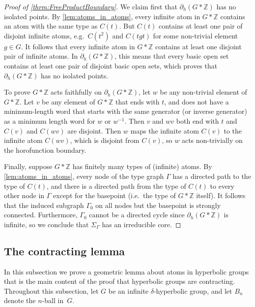 \documentclass[11pt,letterpaper]{amsart}
\theoremstyle{definition}
\newcommand{\Z}{\mathbb{Z}}
\begin{document}
\begin{proof}[Proof of \cref{thrm:FreeProductBoundary}]
We claim first that $\partial_h(G*\Z)$ has no isolated points.  By \cref{lem:atoms_in_atoms}, every infinite atom in $G*\Z$ contains an atom with the same type as $C(t)$.  But $C(t)$ contains at least one pair of disjoint infinite atoms, e.g.\ $C(t^2)$ and $C(tgt)$ for some non-trivial element $g\in G$.  It follows that every infinite atom in $G*\Z$ contains at least one disjoint pair of infinite atoms.  In $\partial_h(G*\Z)$, this means that every basic open set contains at least one pair of disjoint basic open sets, which proves that $\partial_h (G*\Z)$ has no isolated points.

To prove $G*\Z$ acts faithfully on $\partial_h(G*\Z)$, let $w$ be any non-trivial element of $G*\Z$.  Let $v$ be any element of $G*\Z$ that ends with $t$, and does not have a minimum-length word that starts with the same generator (or inverse generator) as a minimum length word for $w$ or $w^{-1}$.  Then $v$ and $wv$ both end with $t$ and $C(v)$ and $C(wv)$ are disjoint.  Then $w$ maps the infinite atom $C(v)$ to the infinite atom $C(wv)$, which is disjoint from $C(v)$, so $w$ acts non-trivially on the horofunction boundary.

Finally, suppose $G*\Z$ has finitely many types of (infinite) atoms.  By \cref{lem:atoms_in_atoms}, every node of the type graph $\Gamma$ has a directed path to the type of $C(t)$, and there is a directed path from the type of $C(t)$ to every other node in $\Gamma$ except for the basepoint (i.e.\ the type of $G*\Z$ itself).  It follows that the induced subgraph $\Gamma_0$ on all nodes but the basepoint is strongly connected. Furthermore, $\Gamma_0$ cannot be a directed cycle since $\partial_h(G*\Z)$ is infinite, so we conclude that $\Sigma_\Gamma$ has an irreducible core.
\end{proof}


\subsection{The contracting lemma}\label{ssec:contractinglemma}

In this subsection we prove a geometric lemma about atoms in hyperbolic groups that is the main content of the proof that hyperbolic groups are contracting. Throughout this subsection, let $G$ be an infinite $\delta$-hyperbolic group, and let $B_n$ denote the $n$-ball in~$G$.
\end{document}
